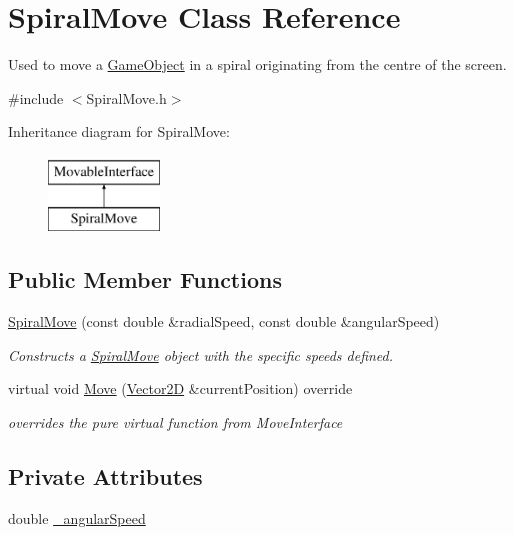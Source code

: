 \hypertarget{class_spiral_move}{}\section{Spiral\+Move Class Reference}
\label{class_spiral_move}


Used to move a \hyperlink{class_game_object}{Game\+Object} in a spiral originating from the centre of the screen.  




{\ttfamily \#include $<$Spiral\+Move.\+h$>$}

Inheritance diagram for Spiral\+Move\+:\begin{figure}[H]
\begin{center}
\leavevmode
\includegraphics[height=2.000000cm]{d5/dcf/class_spiral_move}
\end{center}
\end{figure}
\subsection*{Public Member Functions}
\begin{DoxyCompactItemize}
\item 
\hyperlink{class_spiral_move_a60daaf7772f017481a253898ef4f3e6d}{Spiral\+Move} (const double \&radial\+Speed, const double \&angular\+Speed)
\begin{DoxyCompactList}\small\item\em Constructs a \hyperlink{class_spiral_move}{Spiral\+Move} object with the specific speeds defined. \end{DoxyCompactList}\item 
virtual void \hyperlink{class_spiral_move_a74b22995f5f3c00c623ecaa3adb2ab8e}{Move} (\hyperlink{class_vector2_d}{Vector2D} \&current\+Position) override
\begin{DoxyCompactList}\small\item\em overrides the pure virtual function from Move\+Interface \end{DoxyCompactList}\end{DoxyCompactItemize}
\subsection*{Private Attributes}
\begin{DoxyCompactItemize}
\item 
double \hyperlink{class_spiral_move_a50cae711a780fdf56fffcb279df63f37}{\+\_\+angular\+Speed}
\end{DoxyCompactItemize}

